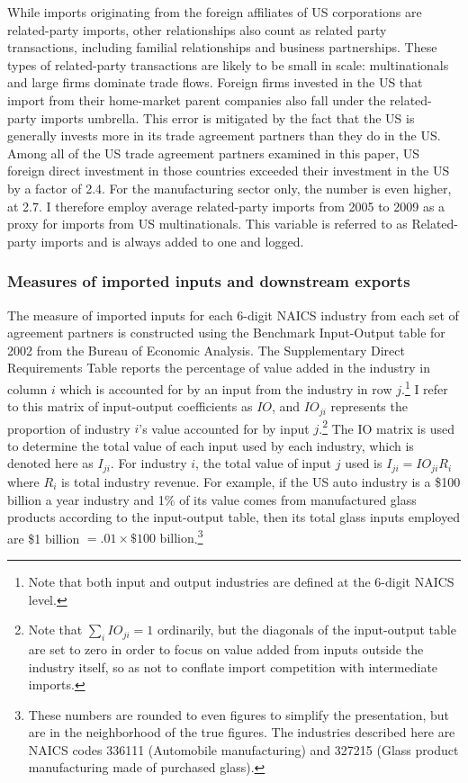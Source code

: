 \documentclass[hidelinks,12pt,letter]{article}
\begin{document}
While imports originating from the foreign affiliates of US corporations are related-party imports, other relationships also count as related party transactions, including familial relationships and business partnerships. These types of related-party transactions are likely to be small in scale: multinationals and large firms dominate trade flows. Foreign firms invested in the US that import from their home-market parent companies also fall under the related-party imports umbrella. This error is mitigated by the fact that the US is generally invests more in its trade agreement partners than they do in the US. Among all of the US trade agreement partners examined in this paper, US foreign direct investment in those countries exceeded their investment in the US by a factor of 2.4. For the manufacturing sector only, the number is even higher, at 2.7. I therefore employ average related-party imports from 2005 to 2009 as a proxy for imports from US multinationals. This variable is referred to as Related-party imports and is always added to one and logged. %

\subsubsection*{Measures of imported inputs and downstream exports}
The measure of imported inputs for each 6-digit NAICS industry from each set of agreement partners is constructed using the Benchmark Input-Output table for 2002 from the Bureau of Economic Analysis. The Supplementary Direct Requirements Table reports the percentage of value added in the industry in column $i$ which is accounted for by an input from the industry in row $j$.\footnote{Note that both input and output industries are defined at the 6-digit NAICS level.} I refer to this matrix of input-output coefficients as $IO$, and $IO_{ji}$ represents the proportion of industry $i$'s value accounted for by input $j$.\footnote{Note that $\sum\limits_i IO_{ji} = 1$ ordinarily, but the diagonals of the input-output table are set to zero in order to focus on value added from inputs outside the industry itself, so as not to conflate import competition with intermediate imports.} The IO matrix is used to determine the total value of each input used by each industry, which is denoted here as $I_{ji}$. For industry $i$, the total value of input $j$ used is $I_{ji} = IO_{ji} R_i$ where $R_i$ is total industry revenue. For example, if the US auto industry is a \$100 billion a year industry and 1\% of its value comes from manufactured glass products according to the input-output table, then its total glass inputs employed are \$1 billion $= .01 \times \$100 \text{ billion}$.\footnote{These numbers are rounded to even figures to simplify the presentation, but are in the neighborhood of the true figures. The industries described here are NAICS codes 336111 (Automobile manufacturing) and  327215 (Glass product manufacturing made of purchased glass).}
\end{document}
